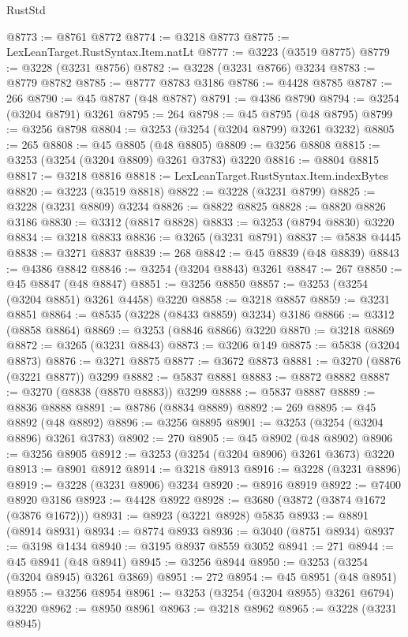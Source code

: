 \begin{lexlean}{RustStd}
\begin{coremodule}
@8773 := @8761 @8772
@8774 := @3218 @8773
@8775 := LexLeanTarget.RustSyntax.Item.natLt
@8777 := @3223 (@3519 @8775)
@8779 := @3228 (@3231 @8756)
@8782 := @3228 (@3231 @8766) @3234
@8783 := @8779 @8782
@8785 := @8777 @8783 @3186
@8786 := @4428 @8785
@8787 := 266
@8790 := @45 @8787 (@48 @8787)
@8791 := @4386 @8790
@8794 := @3254 (@3204 @8791) @3261
@8795 := 264
@8798 := @45 @8795 (@48 @8795)
@8799 := @3256 @8798
@8804 := @3253 (@3254 (@3204 @8799) @3261 @3232)
@8805 := 265
@8808 := @45 @8805 (@48 @8805)
@8809 := @3256 @8808
@8815 := @3253 (@3254 (@3204 @8809) @3261 @3783) @3220
@8816 := @8804 @8815
@8817 := @3218 @8816
@8818 := LexLeanTarget.RustSyntax.Item.indexBytes
@8820 := @3223 (@3519 @8818)
@8822 := @3228 (@3231 @8799)
@8825 := @3228 (@3231 @8809) @3234
@8826 := @8822 @8825
@8828 := @8820 @8826 @3186
@8830 := @3312 (@8817 @8828)
@8833 := @3253 (@8794 @8830) @3220
@8834 := @3218 @8833
@8836 := @3265 (@3231 @8791)
@8837 := @5838 @4445
@8838 := @3271 @8837
@8839 := 268
@8842 := @45 @8839 (@48 @8839)
@8843 := @4386 @8842
@8846 := @3254 (@3204 @8843) @3261
@8847 := 267
@8850 := @45 @8847 (@48 @8847)
@8851 := @3256 @8850
@8857 := @3253 (@3254 (@3204 @8851) @3261 @4458) @3220
@8858 := @3218 @8857
@8859 := @3231 @8851
@8864 := @8535 (@3228 (@8433 @8859) @3234) @3186
@8866 := @3312 (@8858 @8864)
@8869 := @3253 (@8846 @8866) @3220
@8870 := @3218 @8869
@8872 := @3265 (@3231 @8843)
@8873 := @3206 @149
@8875 := @5838 (@3204 @8873)
@8876 := @3271 @8875
@8877 := @3672 @8873
@8881 := @3270 (@8876 (@3221 @8877)) @3299
@8882 := @5837 @8881
@8883 := @8872 @8882
@8887 := @3270 (@8838 (@8870 @8883)) @3299
@8888 := @5837 @8887
@8889 := @8836 @8888
@8891 := @8786 (@8834 @8889)
@8892 := 269
@8895 := @45 @8892 (@48 @8892)
@8896 := @3256 @8895
@8901 := @3253 (@3254 (@3204 @8896) @3261 @3783)
@8902 := 270
@8905 := @45 @8902 (@48 @8902)
@8906 := @3256 @8905
@8912 := @3253 (@3254 (@3204 @8906) @3261 @3673) @3220
@8913 := @8901 @8912
@8914 := @3218 @8913
@8916 := @3228 (@3231 @8896)
@8919 := @3228 (@3231 @8906) @3234
@8920 := @8916 @8919
@8922 := @7400 @8920 @3186
@8923 := @4428 @8922
@8928 := @3680 (@3872 (@3874 @1672 (@3876 @1672)))
@8931 := @8923 (@3221 @8928) @5835
@8933 := @8891 (@8914 @8931)
@8934 := @8774 @8933
@8936 := @3040 (@8751 @8934)
@8937 := @3198 @1434
@8940 := @3195 @8937 @8559 @3052
@8941 := 271
@8944 := @45 @8941 (@48 @8941)
@8945 := @3256 @8944
@8950 := @3253 (@3254 (@3204 @8945) @3261 @3869)
@8951 := 272
@8954 := @45 @8951 (@48 @8951)
@8955 := @3256 @8954
@8961 := @3253 (@3254 (@3204 @8955) @3261 @6794) @3220
@8962 := @8950 @8961
@8963 := @3218 @8962
@8965 := @3228 (@3231 @8945)

\end{coremodule}
\end{lexlean}
